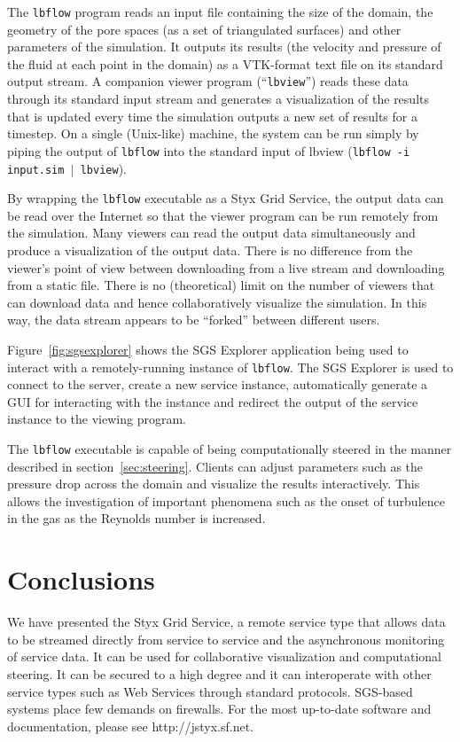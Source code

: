 \documentclass[a4paper]{article}
\begin{document}
\begin{multicols}{2}
The \texttt{lbflow} program reads an input file containing the size of the domain, the geometry of the pore spaces (as a set of triangulated surfaces) and other parameters of the simulation.  It outputs its results (the velocity and pressure of the fluid at each point in the domain) as a VTK-format text file on its standard output stream.  A companion viewer program (``\texttt{lbview}'') reads these data through its standard input stream and generates a visualization of the results that is updated every time the simulation outputs a new set of results for a timestep.  On a single (Unix-like) machine, the system can be run simply by piping the output of \texttt{lbflow} into the standard input of lbview ({\tt lbflow -i input.sim $|$ lbview}).

By wrapping the \texttt{lbflow} executable as a Styx Grid Service, the output data can be read over the Internet so that the viewer program can be run remotely from the simulation.  Many viewers can read the output data simultaneously and produce a visualization of the output data.  There is no difference from the viewer's point of view between downloading from a live stream and downloading from a static file.  There is no (theoretical) limit on the number of viewers that can download data and hence collaboratively visualize the simulation.  In this way, the data stream appears to be ``forked'' between different users.

Figure~\ref{fig:sgsexplorer} shows the SGS Explorer application being used to interact with a remotely-running instance of \texttt{lbflow}.  The SGS Explorer is used to connect to the server, create a new service instance, automatically generate a GUI for interacting with the instance and redirect the output of the service instance to the viewing program.

The \texttt{lbflow} executable is capable of being computationally steered in the manner described in section~\ref{sec:steering}.  Clients can adjust parameters such as the pressure drop across the domain and visualize the results interactively.  This allows the investigation of important phenomena such as the onset of turbulence in the gas as the Reynolds number is increased.

\section{Conclusions}
We have presented the Styx Grid Service, a remote service type that allows data to be streamed directly from service to service and the asynchronous monitoring of service data.  It can be used for collaborative visualization and computational steering.  It can be secured to a high degree and it can interoperate with other service types such as Web Services through standard protocols.  SGS-based systems place few demands on firewalls.  For the most up-to-date software and documentation, please see http://jstyx.sf.net.


\end{multicols}
\end{document}
